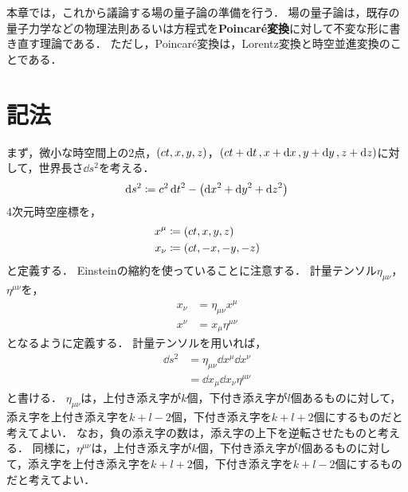 \documentclass{report}
\begin{document}
  本章では，これから議論する場の量子論の準備を行う．
  場の量子論は，既存の量子力学などの物理法則あるいは方程式を\textbf{Poincar\'e変換}に対して不変な形に書き直す理論である．
  ただし，Poincar\'e変換は，Lorentz変換と時空並進変換のことである．
  \section{記法}
    まず，微小な時空間上の2点，$\qty(ct, x, y, z)$，$\qty(ct + \dd{t}, x + \dd{x}, y + \dd{y}, z + \dd{z})$に対して，世界長さ$\dd{s^2}$を考える．
    \begin{align}
      \dd{s^2} \coloneqq c^2\dd{t}^2 - \qty(\dd{x}^2 + \dd{y}^2 + \dd{z}^2)
    \end{align}
    4次元時空座標を，
    \begin{align}
      x^{\mu} &\coloneqq \qty(ct, x, y, z) \\ 
      x_{\nu} &\coloneqq \qty(ct, -x, -y, -z)
    \end{align}
    と定義する．
    Einsteinの縮約を使っていることに注意する．
    計量テンソル$\eta_{\mu\nu}$，$\eta^{\mu\nu}$を，
    \begin{align}
      x_{\nu} &= \eta_{\mu\nu}x^{\mu} \\ 
      x^{\nu} &= x_{\mu}\eta^{\mu\nu}
    \end{align}
    となるように定義する．
    計量テンソルを用いれば，
    \begin{align}
      \dd{s^2} &= \eta_{\mu\nu}\dd{x^{\mu}}\dd{x^{\nu}} \label{def-of-proper-length} \\ 
      &= \dd{x_{\mu}}\dd{x_{\nu}}\eta^{\mu\nu}
    \end{align}
    と書ける．
    $\eta_{\mu\nu}$は，上付き添え字が$k$個，下付き添え字が$l$個あるものに対して，添え字を上付き添え字を$k + l - 2$個，下付き添え字を$k + l + 2$個にするものだと考えてよい．
    なお，負の添え字の数は，添え字の上下を逆転させたものと考える．
    同様に，$\eta^{\mu\nu}$は，上付き添え字が$k$個，下付き添え字が$l$個あるものに対して，添え字を上付き添え字を$k + l + 2$個，下付き添え字を$k + l - 2$個にするものだと考えてよい．
\end{document}
